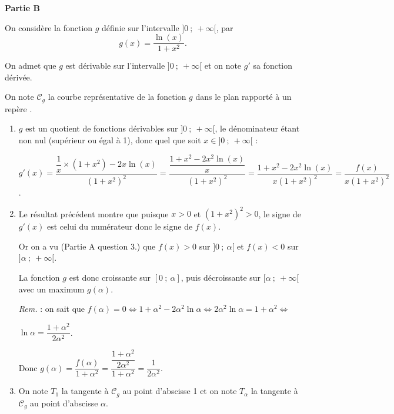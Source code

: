 \bigskip

\textbf{Partie B}

\medskip

On considère la fonction $g$ définie sur l'intervalle $]0~;~+ \infty[$, par 
\[g(x) = \dfrac{\ln (x)}{1 + x^2}.\]

On admet que $g$ est dérivable sur l'intervalle $]0~;~+ \infty[$ et on note $g'$ sa fonction dérivée.

On note $\mathcal{C}_g$ la courbe représentative de la fonction $g$ dans le plan rapporté à un repère \Oij.

\medskip

\begin{enumerate}
\item %
$g$ est un quotient de fonctions dérivables sur $]0~;~+ \infty[$, le dénominateur étant non nul (supérieur ou égal à 1), donc quel que soit $x \in ]0~;~+ \infty[$ :

$g'(x) = \dfrac{\dfrac 1x \times \left(1 + x^2\right) - 2x \ln (x)}{\left(1 + x^2\right)^2} = \dfrac{\dfrac{1 + x^2 - 2x^2\ln (x)}{x}}{\left(1 + x^2\right)^2}  = \dfrac{1 + x^2 - 2x^2\ln (x)}{x\left(1 + x^2\right)^2} = \dfrac{f(x)}{x\left(1 + x^2\right)^2}$.
\item %

Le résultat précédent montre que puisque $x > 0$ et $\left(1 + x^2\right)^2 > 0$, le signe de $g'(x)$ est celui du numérateur donc le signe de $f(x)$.

Or on a vu (Partie A question 3.) que $f(x) > 0$ sur $]0~;~\alpha[$ et $f(x) < 0$ sur $]\alpha~;~+ \infty[$.

La fonction $g$ est donc croissante sur $[0~;~\alpha]$, puis décroissante sur $[\alpha~;~+ \infty[$ avec un maximum $g(\alpha)$.

\emph{Rem.} : on sait que $f(\alpha) = 0 \iff 1 + \alpha^2 - 2\alpha^2 \ln \alpha \iff 2\alpha^2 \ln \alpha = 1 + \alpha^2 \iff $

$\ln \alpha = \dfrac{1 + \alpha^2}{2\alpha^2}$.

Donc $g(\alpha) = \dfrac{f(\alpha)}{1 + \alpha^2} = \dfrac{\dfrac{1 + \alpha^2}{2\alpha^2}}{1 + \alpha^2} = \dfrac{1}{2\alpha^2}$.
\item On note $T_1$ la tangente à $\mathcal{C}_g$ au point d'abscisse 1 et on note $T_{\alpha}$ la tangente à $\mathcal{C}_g$ au point d'abscisse $\alpha$.


\end{enumerate}
